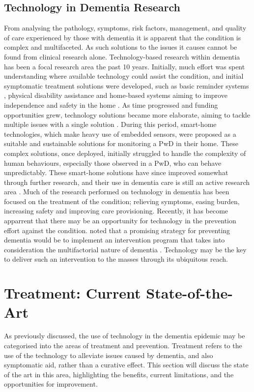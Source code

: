 \subsection{Technology in Dementia Research}
From analysing the pathology, symptoms, risk factors, management, and quality of care experienced by those with dementia it is apparent that the condition is complex and multifaceted. As such solutions to the issues it causes cannot be found from clinical research alone. Technology-based research within dementia has been a focal research area the past 10 years. Initially, much effort was spent understanding where available technology could assist the condition, and initial symptomatic treatment solutions were developed, such as basic reminder systems \cite{Hersh1994, Wilson1997, Morris2003}, physical disability assistance \cite{Nugent2008b} and home-based systems aiming to improve independence and safety in the home \cite{Orpwood2005,Nugent2008b}. As time progressed and funding opportunities grew, technology solutions became more elaborate, aiming to tackle multiple issues with a single solution \cite{Zhang2008,Orpwood2005,Cook2007,Nugent2011}. During this period, smart-home technologies, which make heavy use of embedded sensors, were proposed as a suitable and sustainable solutions for monitoring a PwD in their home. These complex solutions, once deployed, initially struggled to handle the complexity of human behaviours, especially those observed in a PwD, who can behave unpredictably. These smart-home solutions have since improved somewhat through further research, and their use in dementia care is still an active research area \cite{Amiribesheli2015,Wilson2015a}. Much of the research performed on technology in dementia has been focused on the treatment of the condition; relieving symptoms, easing burden, increasing safety and improving care provisioning. Recently, it has become apparrent that there may be an opportunity for technology in the prevention effort against the condition. \citeauthor{Mangialasche2012} noted that a promising strategy for preventing dementia would be to implement an intervention program that takes into consideration the multifactorial nature of dementia \cite{Mangialasche2012}. Technology may be the key to deliver such an intervention to the masses through its ubiquitous reach.

\section{Treatment: Current State-of-the-Art} \label{section: treatment-stateoftheart}
As previously discussed, the use of technology in the dementia epidemic may be categorised into the areas of treatment and prevention. Treatment refers to the use of the technology to alleviate issues caused by dementia, and also symptomatic aid, rather than a curative effect.
This section will discuss the state of the art in this area, highlighting the benefits, current limitations, and the opportunities for improvement.

